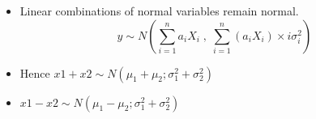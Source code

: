 
\begin{itemize}
    \item 
Linear combinations of normal variables remain normal.
\[
y \sim N \left( \sum^{n}_{i=1} a_iX_i \;,\;  \sum^{n}_{i=1} ( a_iX_i ) \times 
i \sigma^2_i \right)\]
\item Hence $x1 + x2 \sim N(\mu_1 + \mu_2; \sigma^2_1 + \sigma^2_2)$ 
\item $x1 - x2 \sim N(\mu_1 - \mu_2; \sigma^2_1 + \sigma^2_2)$
\end{itemize}